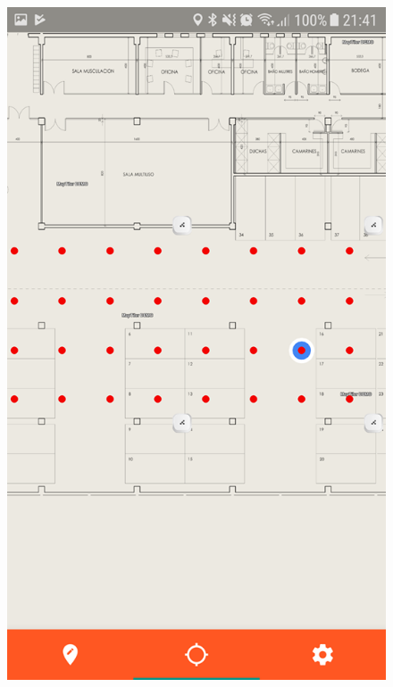 \documentclass[mathserif]{beamer}
\begin{document}
\begin{frame}
\begin{columns}[t]
\begin{figure}
\includegraphics[width=\textwidth]{../figures/fase_online3.png}
\end{figure}

\end{columns}

\end{frame}
\end{document}
